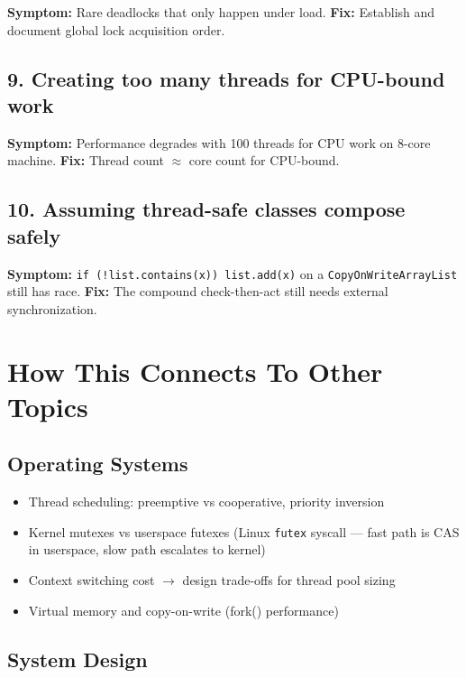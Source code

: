 \documentclass[11pt]{article}
\providecommand{\tightlist}{\setlength{\itemsep}{1pt}\setlength{\parskip}{0pt}}
\begin{document}
\textbf{Symptom:} Rare deadlocks that only happen under load. \textbf{Fix:} Establish and document global lock acquisition order.

\subsection{9. Creating too many threads for CPU-bound work}\label{9-creating-too-many-threads-for-cpu-bound-work}

\textbf{Symptom:} Performance degrades with 100 threads for CPU work on 8-core machine. \textbf{Fix:} Thread count \(\approx\) core count for CPU-bound.

\subsection{10. Assuming thread-safe classes compose safely}\label{10-assuming-thread-safe-classes-compose-safely}

\textbf{Symptom:} \texttt{if\ (!list.contains(x))\ list.add(x)} on a \texttt{CopyOnWriteArrayList} still has race. \textbf{Fix:} The compound check-then-act still needs external synchronization.

\section{How This Connects To Other Topics}\label{how-this-connects-to-other-topics}

\subsection{Operating Systems}\label{operating-systems}

\begin{itemize}
\tightlist
\item
  Thread scheduling: preemptive vs cooperative, priority inversion
\item
  Kernel mutexes vs userspace futexes (Linux \texttt{futex} syscall --- fast path is CAS in userspace, slow path escalates to kernel)
\item
  Context switching cost \(\rightarrow\) design trade-offs for thread pool sizing
\item
  Virtual memory and copy-on-write (fork() performance)
\end{itemize}

\subsection{System Design}\label{system-design}
\end{document}
